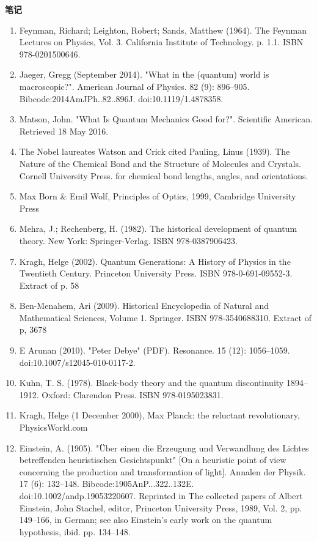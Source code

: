 \textbf{笔记}
\begin{enumerate}
\item Feynman, Richard; Leighton, Robert; Sands, Matthew (1964). The Feynman Lectures on Physics, Vol. 3. California Institute of Technology. p. 1.1. ISBN 978-0201500646.
\item Jaeger, Gregg (September 2014). "What in the (quantum) world is macroscopic?". American Journal of Physics. 82 (9): 896–905. Bibcode:2014AmJPh..82..896J. doi:10.1119/1.4878358.
\item Matson, John. "What Is Quantum Mechanics Good for?". Scientific American. Retrieved 18 May 2016.
\item The Nobel laureates Watson and Crick cited Pauling, Linus (1939). The Nature of the Chemical Bond and the Structure of Molecules and Crystals. Cornell University Press. for chemical bond lengths, angles, and orientations.
\item Max Born & Emil Wolf, Principles of Optics, 1999, Cambridge University Press
\item Mehra, J.; Rechenberg, H. (1982). The historical development of quantum theory. New York: Springer-Verlag. ISBN 978-0387906423.
\item Kragh, Helge (2002). Quantum Generations: A History of Physics in the Twentieth Century. Princeton University Press. ISBN 978-0-691-09552-3. Extract of p. 58
\item Ben-Menahem, Ari (2009). Historical Encyclopedia of Natural and Mathematical Sciences, Volume 1. Springer. ISBN 978-3540688310. Extract of p, 3678
\item E Arunan (2010). "Peter Debye" (PDF). Resonance. 15 (12): 1056–1059. doi:10.1007/s12045-010-0117-2.
\item Kuhn, T. S. (1978). Black-body theory and the quantum discontinuity 1894–1912. Oxford: Clarendon Press. ISBN 978-0195023831.
\item Kragh, Helge (1 December 2000), Max Planck: the reluctant revolutionary, PhysicsWorld.com
\item Einstein, A. (1905). "Über einen die Erzeugung und Verwandlung des Lichtes betreffenden heuristischen Gesichtspunkt" [On a heuristic point of view concerning the production and transformation of light]. Annalen der Physik. 17 (6): 132–148. Bibcode:1905AnP...322..132E. doi:10.1002/andp.19053220607. Reprinted in The collected papers of Albert Einstein, John Stachel, editor, Princeton University Press, 1989, Vol. 2, pp. 149–166, in German; see also Einstein's early work on the quantum hypothesis, ibid. pp. 134–148.

\end{enumerate}
